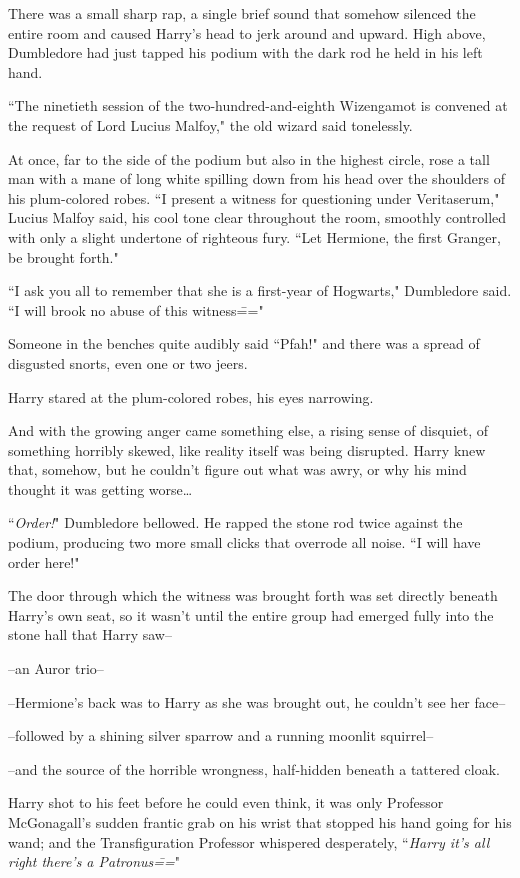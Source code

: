 There was a small sharp rap, a single brief sound that somehow silenced the entire room and caused Harry's head to jerk around and upward. High above, Dumbledore had just tapped his podium with the dark rod he held in his left hand.

``The ninetieth session of the two-hundred-and-eighth Wizengamot is convened at the request of Lord Lucius Malfoy," the old wizard said tonelessly.

At once, far to the side of the podium but also in the highest circle, rose a tall man with a mane of long white spilling down from his head over the shoulders of his plum-colored robes. ``I present a witness for questioning under Veritaserum," Lucius Malfoy said, his cool tone clear throughout the room, smoothly controlled with only a slight undertone of righteous fury. ``Let Hermione, the first Granger, be brought forth."

``I ask you all to remember that she is a first-year of Hogwarts," Dumbledore said. ``I will brook no abuse of this witness\==="

Someone in the benches quite audibly said ``Pfah!" and there was a spread of disgusted snorts, even one or two jeers.

Harry stared at the plum-colored robes, his eyes narrowing.

And with the growing anger came something else, a rising sense of disquiet, of something horribly skewed, like reality itself was being disrupted. Harry knew that, somehow, but he couldn't figure out what was awry, or why his mind thought it was getting worse{\ldots}

``\emph{Order!}" Dumbledore bellowed. He rapped the stone rod twice against the podium, producing two more small clicks that overrode all noise. ``I will have order here!"

The door through which the witness was brought forth was set directly beneath Harry's own seat, so it wasn't until the entire group had emerged fully into the stone hall that Harry saw\---

\---an Auror trio\---

\---Hermione's back was to Harry as she was brought out, he couldn't see her face\---

\---followed by a shining silver sparrow and a running moonlit squirrel\---

\---and the source of the horrible wrongness, half-hidden beneath a tattered cloak.

Harry shot to his feet before he could even think, it was only Professor McGonagall's sudden frantic grab on his wrist that stopped his hand going for his wand; and the Transfiguration Professor whispered desperately, ``\emph{Harry it's all right there's a Patronus\===}"

